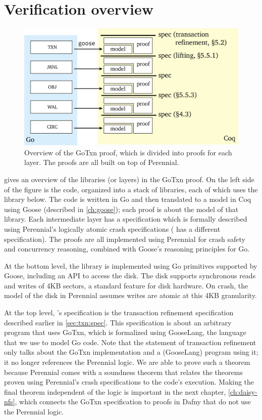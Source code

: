 \section{Verification overview}%
\label{sec:txn:overview}

\begin{figure}
  \centering
  \includegraphics{fig/gotxn.png}
  \caption{Overview of the GoTxn proof, which is divided into proofs for each
    layer. The proofs are all built on top of Perennial.}
  \label{fig:txn:proof-overview}
\end{figure}

 gives an overview of the libraries (or layers) in
the GoTxn proof. On the left side of the figure is the code, organized into a
stack of libraries, each of which uses the library below. The code is written in
Go and then translated to a model in Coq using Goose (described in
\cref{ch:goose}); each proof is about the model of that library. Each
intermediate layer has a specification which is formally described using
Perennial's logically atomic crash specifications ( has a different
specification). The proofs are all implemented using Perennial for crash safety
and concurrency reasoning, combined with Goose's reasoning principles for Go.

At the bottom level, the  library is implemented using Go primitives
supported by Goose, including an API to access the disk. The disk supports
synchronous reads and writes of 4KB sectors, a standard feature for disk
hardware. On crash, the model of the disk in Perennial assumes writes are atomic
at this 4KB granularity.

At the top level, 's specification is the transaction refinement
specification described earlier in \cref{sec:txn:spec}. This specification is
about an arbitrary program that uses GoTxn, which is formalized using GooseLang,
the language that we use to model Go code. Note that the statement of transaction
refinement only talks about the GoTxn implementation and a (GooseLang) program
using it; it no longer references the Perennial logic. We are able to prove such
a theorem because Perennial comes with a soundness theorem that relates the
theorems proven using Perennial's crash specifications to the code's execution.
Making the final theorem independent of the logic is important in the next
chapter, \cref{ch:daisy-nfs}, which connects the GoTxn specification to proofs
in Dafny that do not use the Perennial logic.
